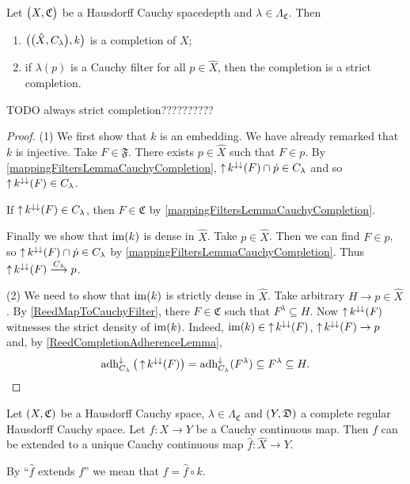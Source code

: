 \begin{proposition}
Let $\sSet[\big]{X, \mathfrak{C}}$ be a Hausdorff Cauchy spacedepth and $\lambda \in \Lambda_\mathfrak{C}$. Then
\begin{enumerate}
\item $\sSet[\big]{\sSet[\big]{\hat{X}, C_\lambda}, k}$ is a completion of $X$;
\item if $\lambda(p)$ is a Cauchy filter for all $p\in\hat{X}$, then the completion is a strict completion.
\end{enumerate}
\end{proposition}
TODO always strict completion??????????
\begin{proof}
(1) We first show that $k$ is an embedding. We have already remarked that $k$ is injective. Take $F\in \mathfrak{F}$. There exists $p\in \hat{X}$ such that $F\in p$. By \ref{mappingFiltersLemmaCauchyCompletion}, $\operatorname{\uparrow} k^{\downarrow\downarrow}(F)\cap\dot{p}\in C_\lambda$ and so $\operatorname{\uparrow} k^{\downarrow\downarrow}(F)\in C_\lambda$.

If $\operatorname{\uparrow} k^{\downarrow\downarrow}(F)\in C_\lambda$, then $F\in\mathfrak{C}$ by \ref{mappingFiltersLemmaCauchyCompletion}.

Finally we show that $\operatorname{im}(k)$ is dense in $\hat{X}$. Take $p\in \hat{X}$. Then we can find $F\in p$, so $\operatorname{\uparrow} k^{\downarrow\downarrow}(F)\cap\dot{p}\in C_\lambda$ by \ref{mappingFiltersLemmaCauchyCompletion}. Thus $\operatorname{\uparrow} k^{\downarrow\downarrow}(F) \overset{C_\lambda}{\longrightarrow} p$.

(2) We need to show that $\operatorname{im}(k)$ is strictly dense in $\hat{X}$. Take arbitrary $H\to p\in\hat{X}$. By \ref{ReedMapToCauchyFilter}, there $F\in \mathfrak{C}$ such that $F^\lambda \subseteq H$. Now $\operatorname{\uparrow} k^{\downarrow\downarrow}(F)$ witnesses the strict density of $\operatorname{im}(k)$. Indeed, $\operatorname{im}(k) \in \operatorname{\uparrow} k^{\downarrow\downarrow}(F)$, $\operatorname{\uparrow} k^{\downarrow\downarrow}(F) \to p$ and, by \ref{ReedCompletionAdherenceLemma},
\[ \operatorname{adh}_{C_\lambda}^\downarrow\big(\operatorname{\uparrow} k^{\downarrow\downarrow}(F)\big) = \operatorname{adh}_{C_\lambda}^\downarrow(F^\lambda) \subseteq F^\lambda \subseteq H. \]
\end{proof}


\begin{proposition} \label{extensionCauchyContinuousMapToCompletion}
Let $\sSet{X, \mathfrak{C}}$ be a Hausdorff Cauchy space, $\lambda \in \Lambda_\mathfrak{C}$ and $\sSet{Y,\mathfrak{D}}$ a complete regular Hausdorff Cauchy space. Let $f: X\to Y$ be a Cauchy continuous map. Then $f$ can be extended to a unique Cauchy continuous map $\hat{f}: \hat{X}\to Y$.
\end{proposition}
By ``$\hat{f}$ extends $f$'' we mean that $f = \hat{f}\circ k$.

